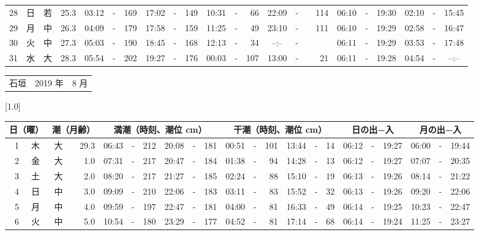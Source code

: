 \documentclass[12pt,a4j]{jsarticle}
\begin{document}
\begin{table}[htbp]
\begin{center}
{\begin{tabular}{|rc|cr|ccrccr|ccrccr|ccc|ccc|}
28 & 日 & 若 & 25.3 &  03:12 &-& 169 &  17:02 &-& 149 &  10:31 &-&  66 &  22:09 &-& 114 & 06:10 & -& 19:30 & 02:10 & -& 15:45 \\
29 & 月 & 中 & 26.3 &  04:09 &-& 179 &  17:58 &-& 159 &  11:25 &-&  49 &  23:10 &-& 111 & 06:10 & -& 19:29 & 02:58 & -& 16:47 \\
30 & 火 & 中 & 27.3 &  05:03 &-& 190 &  18:45 &-& 168 &  12:13 &-&  34 &  --:-- &-&~~~~~ & 06:11 & -& 19:29 & 03:53 & -& 17:48 \\
31 & 水 & 大 & 28.3 &  05:54 &-& 202 &  19:27 &-& 176 &  00:03 &-& 107 &  13:00 &-&  21 & 06:11 & -& 19:28 & 04:54 & -& --:-- \\
   \hline
   \end{tabular}}
   \end{center}
\end{table}
\newpage
 \begin{table}[htbp]
 \begin{center}
 \begin{tabular}{lcc}
 \LARGE{石垣}  & \large{2019 年} & \large{ 8 月} \\
 \end{tabular}
 \end{center}
 \begin{center}
    \scalebox{0.7}[1.0]{
    \begin{tabular}{|rc|cr|ccrccr|ccrccr|ccc|ccc|}
    \hline
    \multicolumn{2}{|c|}{日（曜）} & \multicolumn{2}{c|}{潮（月齢）} & \multicolumn{6}{c|}{満潮（時刻、潮位 cm）} & \multicolumn{6}{c|}{干潮（時刻、潮位 cm）} & \multicolumn{3}{c|}{日の出−入} &  \multicolumn{3}{c|}{月の出−入}\\
 \hline
 1 & 木 & 大 & 29.3 &  06:43 &-& 212 &  20:08 &-& 181 &  00:51 &-& 101 &  13:44 &-&  14 & 06:12 & -& 19:27 & 06:00 & -& 19:44 \\
 2 & 金 & 大 &  1.0 &  07:31 &-& 217 &  20:47 &-& 184 &  01:38 &-&  94 &  14:28 &-&  13 & 06:12 & -& 19:27 & 07:07 & -& 20:35 \\
 3 & 土 & 大 &  2.0 &  08:20 &-& 217 &  21:27 &-& 185 &  02:24 &-&  88 &  15:10 &-&  19 & 06:13 & -& 19:26 & 08:14 & -& 21:22 \\
 4 & 日 & 中 &  3.0 &  09:09 &-& 210 &  22:06 &-& 183 &  03:11 &-&  83 &  15:52 &-&  32 & 06:13 & -& 19:26 & 09:20 & -& 22:06 \\
 5 & 月 & 中 &  4.0 &  09:59 &-& 197 &  22:47 &-& 181 &  04:00 &-&  81 &  16:33 &-&  49 & 06:14 & -& 19:25 & 10:23 & -& 22:47 \\
 6 & 火 & 中 &  5.0 &  10:54 &-& 180 &  23:29 &-& 177 &  04:52 &-&  81 &  17:14 &-&  68 & 06:14 & -& 19:24 & 11:25 & -& 23:27 \\

\end{tabular}}
\end{center}
\end{table}
\end{document}
